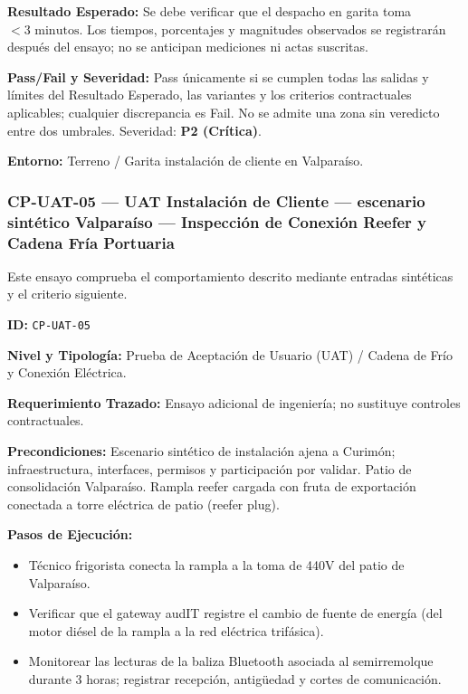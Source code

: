 \par\noindent\textbf{Resultado Esperado:} Se debe verificar que el despacho en garita toma \(< 3\text{ minutos}\). Los tiempos, porcentajes y magnitudes observados se registrarán después del ensayo; no se anticipan mediciones ni actas suscritas.\par
\par\noindent\textbf{Pass/Fail y Severidad:} Pass únicamente si se cumplen todas las salidas y límites del Resultado Esperado, las variantes y los criterios contractuales aplicables; cualquier discrepancia es Fail. No se admite una zona sin veredicto entre dos umbrales. Severidad: \textbf{P2 (Crítica)}.\par
\par\noindent\textbf{Entorno:} Terreno / Garita instalación de cliente en Valparaíso.\par






\subsubsection*{CP-UAT-05 — UAT Instalación de Cliente — escenario sintético Valparaíso — Inspección de Conexión Reefer y Cadena Fría Portuaria}\label{sec:9-cp-uat-05}

Este ensayo comprueba el comportamiento descrito mediante entradas sintéticas y el criterio siguiente.

\par\noindent\textbf{ID:} \texttt{CP-\allowbreak{}UAT-\allowbreak{}05}\par
\par\noindent\textbf{Nivel y Tipología:} Prueba de Aceptación de Usuario (UAT) / Cadena de Frío y Conexión Eléctrica.\par
\par\noindent\textbf{Requerimiento Trazado:} Ensayo adicional de ingeniería; no sustituye controles contractuales.\par
\par\noindent\textbf{Precondiciones:} Escenario sintético de instalación ajena a Curimón; infraestructura, interfaces, permisos y participación por validar.  Patio de consolidación Valparaíso. Rampla reefer cargada con fruta de exportación conectada a torre eléctrica de patio (reefer plug).\par
\par\noindent\textbf{Pasos de Ejecución:}\par
\begin{itemize}
\item Técnico frigorista conecta la rampla a la toma de 440V del patio de Valparaíso.
\item Verificar que el gateway audIT registre el cambio de fuente de energía (del motor diésel de la rampla a la red eléctrica trifásica).
\item Monitorear las lecturas de la baliza Bluetooth asociada al semirremolque durante 3 horas; registrar recepción, antigüedad y cortes de comunicación.
\end{itemize}

